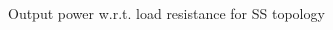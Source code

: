 
\begin{figure}[h]
\centering
\begin{subfigmatrix}{2} 
\end{subfigmatrix}
\end{figure}
\begin{figure}[H]
\centering
\begin{subfigmatrix}{1} 
\end{subfigmatrix}
\caption{Output power w.r.t. load resistance for SS topology}
\end{figure}

